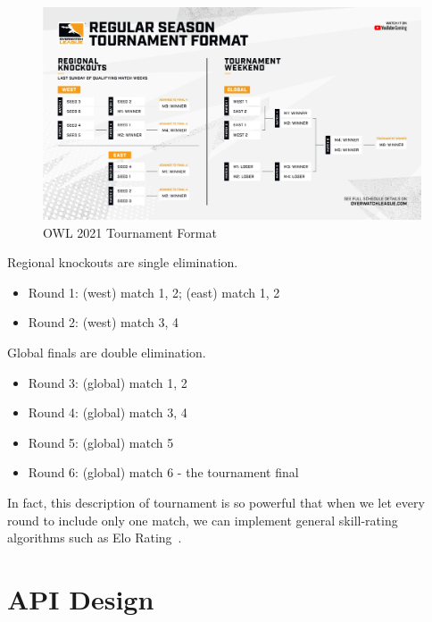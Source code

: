 \begin{figure}[H]
    \centering
    \includegraphics[width=\textwidth]{images/owl-tournament-format.png}
    \caption{OWL 2021 Tournament Format}
    \label{fig:owl-tournament-format}
\end{figure}

Regional knockouts are single elimination.
\begin{itemize}
    \item Round 1: (west) match 1, 2; (east) match 1, 2
    \item Round 2: (west) match 3, 4
\end{itemize}

Global finals are double elimination.
\begin{itemize}
    \item Round 3: (global) match 1, 2
    \item Round 4: (global) match 3, 4
    \item Round 5: (global) match 5
    \item Round 6: (global) match 6 - the tournament final
\end{itemize}

In fact, this description of tournament is so powerful that when we let every round to include only one match, we can implement general skill-rating algorithms such as Elo Rating~\parencite{elo1978rating}.

\section{API Design}
\label{as:matchmaking-api_design}

